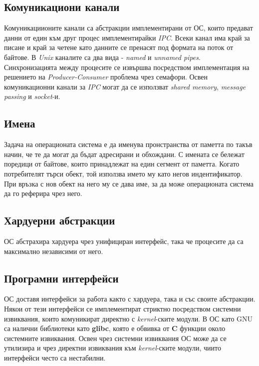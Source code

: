 \documentclass[fleqn,12pt]{article}
\begin{document}
\subsection{Комуникациони канали}

Комуникациионите канали са абстракции имплементирани от ОС, които предават данни от един към друг процес имплементирайки \textit{IPC}.
Всеки канал има край за писане и край за четене като данните се пренасят под формата на поток от байтове.
В \textit{Unix} каналите са два вида - \textit{named}  и \textit{unnamed pipes}.
Синхронизацията между процесите се извършва посредством имплементация на решението на \textit{Producer-Consumer} проблема чрез семафори.
Освен комуникационни канали за \textit{IPC} могат да се използват \textit{shared memory}, \textit{message passing} и \textit{socket}-и.

\subsection{Имена}

Задача на операционата система е да именува пронстранства от паметта по такъв начин, че те да могат да бъдат адресирани и обхождани.
С имената се бележат поредици от байтове, които принадлежат на един сегмент от паметта.
Когато потребителят търси обект, той използва името му като негов индентификатор.
При връзка с нов обект на него му се дава име, за да може операционата система да го реферира чрез него.

\subsection{Хардуерни абстракции}

ОС абстрахира хардуера чрез унифициран интерфейс, така че процесите да са максимално независими от него.

\subsection{Програмни интерфейси}

ОС доставя интерфейси за работа както с хардуера, така и със своите абстракции.
Някои от тези интерфейси се имплементират стриктно посредством системни извиквания, които комуникират директно с \textit{kernel}-ските модули.
В ОС като GNU са налични библиотеки като \textbf{glibc}, която е обвивка от \textbf{C} функции около системните извиквания.
Освен чрез системни извиквания ОС може да се утилизира и чрез директни извиквания към \textit{kernel}-ските модули, чиито интерфейси често са нестабилни.
\end{document}
